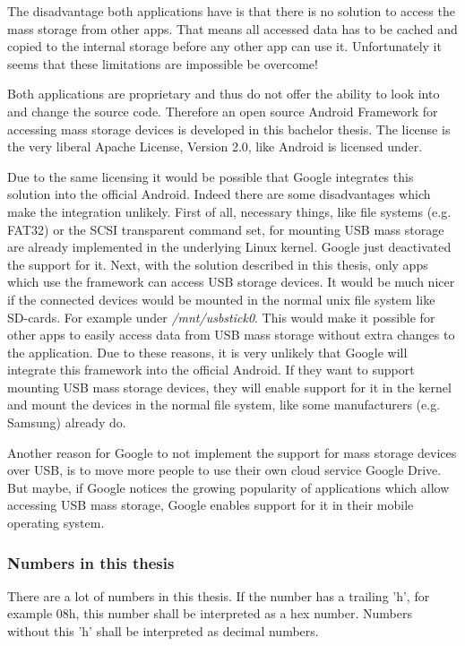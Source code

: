 The disadvantage both applications have is that there is no solution to access the mass storage from other apps. That means all accessed data has to be cached and copied to the internal storage before any other app can use it. Unfortunately it seems that these limitations are impossible be overcome!

Both applications are proprietary and thus do not offer the ability to look into and change the source code. Therefore an open source Android Framework for accessing mass storage devices is developed in this bachelor thesis. The license is the very liberal Apache License, Version 2.0, like Android is licensed under.

Due to the same licensing it would be possible that Google integrates this solution into the official Android. Indeed there are some disadvantages which make the integration unlikely. First of all, necessary things, like file systems (e.g. FAT32) or the SCSI transparent command set, for mounting USB mass storage are already implemented in the underlying Linux kernel. Google just deactivated the support for it. Next, with the solution described in this thesis, only apps which use the framework can access USB storage devices. It would be much nicer if the connected devices would be mounted in the normal unix file system like SD-cards. For example under \textit{/mnt/usbstick0}. This would make it possible for other apps to easily access data from USB mass storage without extra changes to the application. Due to these reasons, it is very unlikely that Google will integrate this framework into the official Android. If they want to support mounting USB mass storage devices, they will enable support for it in the kernel and mount the devices in the normal file system, like some manufacturers (e.g. Samsung) already do.

Another reason for Google to not implement the support for mass storage devices over USB, is to move more people to use their own cloud service Google Drive. But maybe, if Google notices the growing popularity of applications which allow accessing USB mass storage, Google enables support for it in their mobile operating system.

\subsubsection{Numbers in this thesis}

There are a lot of numbers in this thesis. If the number has a trailing 'h', for example 08h, this number shall be interpreted as a hex number. Numbers without this 'h' shall be interpreted as decimal numbers.

